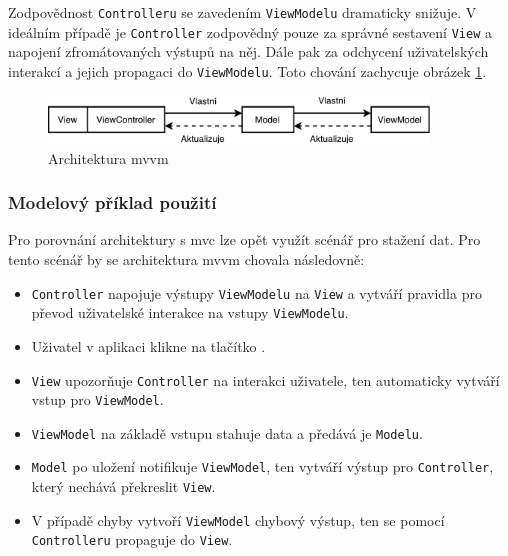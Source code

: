 
Zodpovědnost \texttt{Controlleru} se zavedením \texttt{ViewModelu} dramaticky snižuje.
V ideálním případě je \texttt{Controller} zodpovědný pouze za správné sestavení \texttt{View} a napojení zfromátovaných výstupů na něj.
Dále pak za odchycení uživatelských interakcí a jejich propagaci do \texttt{ViewModelu}.
Toto chování zachycuje obrázek \ref{architektura-mvvm}.

\begin{figure}\centering
	\includegraphics[width=0.9\textwidth]{assets/analysis-mvvm-architecture.pdf}
	\caption[Architektura \acrshort{mvvm}]{Architektura \acrshort{mvvm}}\label{architektura-mvvm}
\end{figure}

\subsubsection*{Modelový příklad použití} \label{architektura-mvvm-priklad}

Pro porovnání architektury s \acrshort{mvc} lze opět využít scénář pro stažení dat.
Pro tento scénář by se architektura \acrshort{mvvm} chovala následovně:
\begin{itemize}
  \item \texttt{Controller} napojuje výstupy \texttt{ViewModelu} na \texttt{View} a vytváří pravidla pro převod uživatelské interakce na vstupy \texttt{ViewModelu}.
  \item Uživatel v aplikaci klikne na tlačítko .
  \item \texttt{View} upozorňuje \texttt{Controller} na interakci uživatele, ten automaticky vytváří vstup pro \texttt{ViewModel}.
  \item \texttt{ViewModel} na základě vstupu stahuje data a předává je \texttt{Modelu}.
  \item \texttt{Model} po uložení notifikuje \texttt{ViewModel}, ten vytváří výstup pro \texttt{Controller}, který nechává překreslit \texttt{View}.
  \item V případě chyby vytvoří \texttt{ViewModel} chybový výstup, ten se pomocí \texttt{Controlleru} propaguje do \texttt{View}.
\end{itemize}

